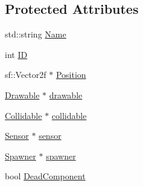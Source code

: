 \subsection*{Protected Attributes}
\begin{DoxyCompactItemize}
\item 
std\-::string \hyperlink{class_game_component_ab1037207fec65ac5fe65dec1e22f0566}{Name}
\item 
int \hyperlink{class_game_component_ac8d794e78280785eb956eaff044f74b2}{I\-D}
\item 
sf\-::\-Vector2f $\ast$ \hyperlink{class_game_component_acc3109bb4ae36112eb8796e067160c59}{Position}
\item 
\hyperlink{class_drawable}{Drawable} $\ast$ \hyperlink{class_game_component_acb73190345f4933825e9c8b8d5030438}{drawable}
\item 
\hyperlink{class_collidable}{Collidable} $\ast$ \hyperlink{class_game_component_aa91bd3600bd5964b55c7806dcfd1c862}{collidable}
\item 
\hyperlink{class_sensor}{Sensor} $\ast$ \hyperlink{class_game_component_ad585bf57df228afc83fbf777142e51bd}{sensor}
\item 
\hyperlink{class_spawner}{Spawner} $\ast$ \hyperlink{class_game_component_a15caaab21ec2e8eb9d438a25afbef4da}{spawner}
\item 
bool \hyperlink{class_game_component_a78058666ddc8662775b13b82e4b615a9}{Dead\-Component}
\end{DoxyCompactItemize}


